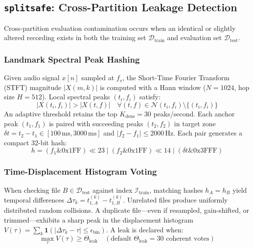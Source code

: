 \documentclass[10pt,journal,compsoc]{IEEEtran}
\begin{document}
\subsection{\texttt{splitsafe}: Cross-Partition Leakage Detection}
Cross-partition evaluation contamination occurs when an identical or slightly altered recording exists in both the training set $\mathcal{D}_{\text{train}}$ and evaluation set $\mathcal{D}_{\text{test}}$.

\subsubsection{Landmark Spectral Peak Hashing}
Given audio signal $x[n]$ sampled at $f_s$, the Short-Time Fourier Transform (STFT) magnitude $|X(m, k)|$ is computed with a Hann window ($N=1024$, hop size $H=512$). Local spectral peaks $(t_i, f_i)$ satisfy:
\begin{equation}
|X(t_i, f_i)| > |X(t, f)| \quad \forall (t, f) \in \mathcal{N}(t_i, f_i) \setminus \{(t_i, f_i)\}
\end{equation}
An adaptive threshold retains the top $K_{\text{dens}} = 30$ peaks/second. Each anchor peak $(t_1, f_1)$ is paired with succeeding peaks $(t_2, f_2)$ in target zone $\delta t = t_2 - t_1 \in [100\,\text{ms}, 3000\,\text{ms}]$ and $|f_2 - f_1| \le 2000$\,Hz. Each pair generates a compact 32-bit hash:
\begin{equation}
h = (f_1 \mathbin{\&} \text{0x1FF}) \ll 23 \mathrel{|} (f_2 \mathbin{\&} \text{0x1FF}) \ll 14 \mathrel{|} (\delta t \mathbin{\&} \text{0x3FFF})
\end{equation}

\subsubsection{Time-Displacement Histogram Voting}
When checking file $B \in \mathcal{D}_{\text{test}}$ against index $\mathcal{I}_{\text{train}}$, matching hashes $h_A = h_B$ yield temporal differences $\Delta \tau_k = t_{1, A}^{(k)} - t_{1, B}^{(k)}$. Unrelated files produce uniformly distributed random collisions. A duplicate file—even if resampled, gain-shifted, or trimmed—exhibits a sharp peak in the displacement histogram $V(\tau) = \sum_k \mathbf{1}(|\Delta \tau_k - \tau| \le \epsilon_{\text{bin}})$. A leak is declared when:
\begin{equation}
\max_\tau V(\tau) \ge \Theta_{\text{leak}} \quad (\text{default } \Theta_{\text{leak}} = 30 \text{ coherent votes})
\end{equation}
\end{document}
